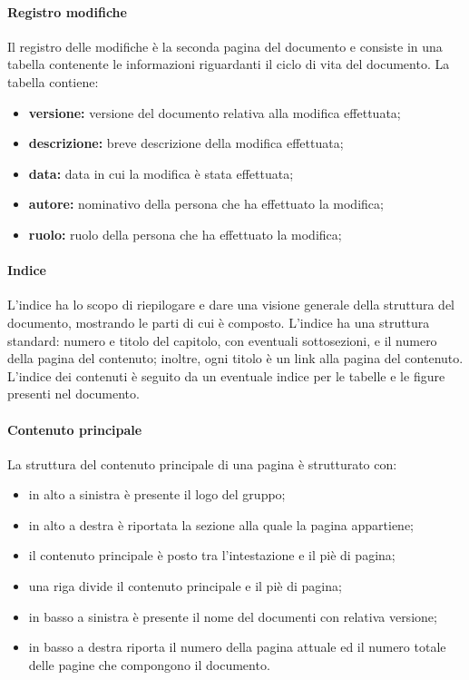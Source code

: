 			\paragraph{Registro modifiche}
			\label{par: Registro modifiche}
				Il registro delle modifiche è la seconda pagina del documento e consiste in una tabella contenente le informazioni riguardanti il ciclo di vita del documento. La tabella contiene:
				\begin{itemize}
					\item \textbf{versione:} versione del documento relativa alla modifica effettuata;
					\item \textbf{descrizione:} breve descrizione della modifica effettuata;
					\item \textbf{data:} data in cui la modifica è stata effettuata;
					\item \textbf{autore:} nominativo della persona che ha effettuato la modifica;
					\item \textbf{ruolo:} ruolo della persona che ha effettuato la modifica;
				\end{itemize}
			\paragraph{Indice}
				L'indice ha lo scopo di riepilogare e dare una visione generale della struttura del documento, mostrando le parti di cui è composto. L'indice ha una struttura standard: numero e titolo del capitolo, con eventuali sottosezioni, e il numero della pagina del contenuto; inoltre, ogni titolo è un link alla pagina del contenuto. L'indice dei contenuti è seguito da un eventuale indice per le tabelle e le figure presenti nel documento.
			\paragraph{Contenuto principale}
				La struttura del contenuto principale di una pagina è strutturato con:
					\begin{itemize}
						\item in alto a sinistra è presente il logo del gruppo;
						\item in alto a destra è riportata la sezione alla quale la pagina appartiene;
						\item il contenuto principale è posto tra l'intestazione e il piè di pagina;
						\item una riga divide il contenuto principale e il piè di pagina;
						\item in basso a sinistra è presente il nome del documenti con relativa versione;
						\item in basso a destra riporta il numero della pagina attuale ed il numero totale delle pagine che compongono il documento.
					\end{itemize}
